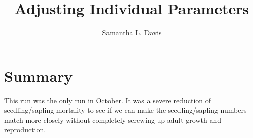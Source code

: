 \documentclass{article}
\begin{document}


\title{Adjusting Individual Parameters}
\author{Samantha L. Davis}

\maketitle

\section{Summary}
This run was the only run in October. It was a severe reduction of seedling/sapling mortality to see if we can make the seedling/sapling numbers match more closely without completely screwing up adult growth and reproduction. 
\end{document}
